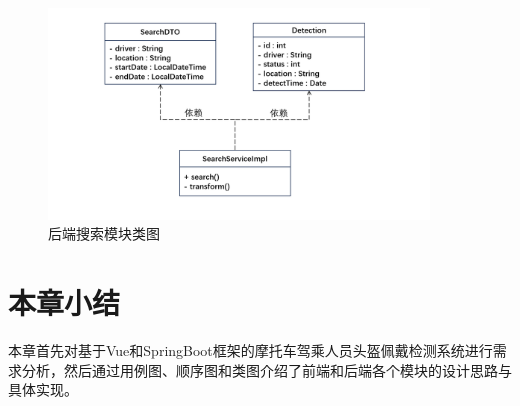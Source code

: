 \begin{figure}[h]
    \centering
    \includegraphics[width=0.9\textwidth]{figs/chap05/class2.png}
    \caption{后端搜索模块类图}
    \label{fig:class2}
\end{figure}

\section{本章小结}
本章首先对基于Vue和SpringBoot框架的摩托车驾乘人员头盔佩戴检测系统进行需求分析，然后通过用例图、顺序图和类图介绍了前端和后端各个模块的设计思路与具体实现。

